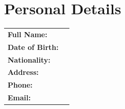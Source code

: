 
\section{Personal Details}
\label{sec:personal}

\noindent
\begin{tabular}{p{6cm} p{10cm}}
\textbf{Full Name:} & \TestatorName{} \\ 
\textbf{Date of Birth:} & \TestatorBirthday{} \\ 
\textbf{Nationality:} & \TestatorNationality{} \\ 
\textbf{Address:} & \TestatorAddress{}\\ 
\textbf{Phone:} & \TestatorPhone{}\\ 
\textbf{Email:} & \TestatorEmail{}\\ 
\end{tabular}

\vspace*{0.2cm}

